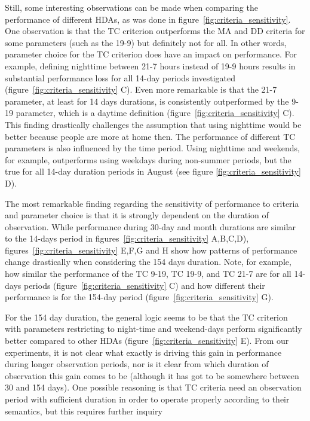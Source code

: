 \documentclass[a4paper]{article}
\begin{document}
Still, some interesting observations can be made when comparing the performance of different HDAs, as was done in figure~\ref{fig:criteria_sensitivity}. One observation is that the TC criterion outperforms the MA and DD criteria for some parameters (such as the 19-9) but definitely not for all. In other words, parameter choice for the TC criterion does have an impact on performance. For example, defining nighttime between 21-7 hours instead of 19-9 hours results in substantial performance loss for all 14-day periods investigated (figure~\ref{fig:criteria_sensitivity} C). Even more remarkable is that the 21-7 parameter, at least for 14 days durations, is consistently outperformed by the 9-19 parameter, which is a daytime definition (figure~\ref{fig:criteria_sensitivity} C). This finding drastically challenges the assumption that using nighttime would be better because people are more at home then. The performance of different TC parameters is also influenced by the time period. Using nighttime and weekends, for example, outperforms using weekdays during non-summer periods, but the true for all 14-day duration periods in August (see figure \ref{fig:criteria_sensitivity} D).

The most remarkable finding regarding the sensitivity of performance to criteria and parameter choice is that it is strongly dependent on the duration of observation. While performance during 30-day and month durations are similar to the 14-days period in figures~\ref{fig:criteria_sensitivity} A,B,C,D), figures~\ref{fig:criteria_sensitivity} E,F,G and H show how patterns of performance change drastically when considering the 154 days duration. Note, for example, how similar the performance of the TC 9-19, TC 19-9, and TC 21-7 are for all 14-days periods (figure~\ref{fig:criteria_sensitivity} C) and how different their performance is for the 154-day period (figure~\ref{fig:criteria_sensitivity} G). 

For the 154 day duration, the general logic seems to be that the TC criterion with parameters restricting to night-time and weekend-days perform significantly better compared to other HDAs (figure~\ref{fig:criteria_sensitivity} E). From our experiments, it is not clear what exactly is driving this gain in performance during longer observation periods, nor is it clear from which duration of observation this gain comes to be (although it has got to be somewhere between 30 and 154 days). One possible reasoning is that TC criteria need an observation period with sufficient duration in order to operate properly according to their semantics, but this requires further inquiry
\end{document}
